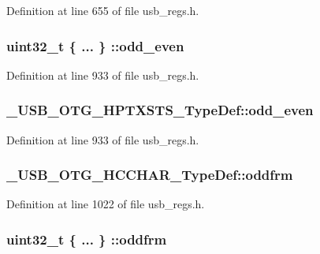 Definition at line 655 of file usb\-\_\-regs.\-h.

\hypertarget{group___u_s_b___o_t_g___d_r_i_v_e_r_gad65d7f25e633ae62cfa42f7c4ef99378}{
\subsubsection[{odd\-\_\-even}]{\setlength{\rightskip}{0pt plus 5cm}uint32\-\_\-t \{ ... \} \-::odd\-\_\-even}}\label{group___u_s_b___o_t_g___d_r_i_v_e_r_gad65d7f25e633ae62cfa42f7c4ef99378}


Definition at line 933 of file usb\-\_\-regs.\-h.

\hypertarget{group___u_s_b___o_t_g___d_r_i_v_e_r_ga668937b5e6c1ce05ba41a2b1a71dcddd}{
\subsubsection[{odd\-\_\-even}]{ \-\_\-\-U\-S\-B\-\_\-\-O\-T\-G\-\_\-\-H\-P\-T\-X\-S\-T\-S\-\_\-\-Type\-Def\-::odd\-\_\-even}}\label{group___u_s_b___o_t_g___d_r_i_v_e_r_ga668937b5e6c1ce05ba41a2b1a71dcddd}


Definition at line 933 of file usb\-\_\-regs.\-h.

\hypertarget{group___u_s_b___o_t_g___d_r_i_v_e_r_gac32b5a32fe881b0a669794c7a78665ed}{
\subsubsection[{oddfrm}]{ \-\_\-\-U\-S\-B\-\_\-\-O\-T\-G\-\_\-\-H\-C\-C\-H\-A\-R\-\_\-\-Type\-Def\-::oddfrm}}\label{group___u_s_b___o_t_g___d_r_i_v_e_r_gac32b5a32fe881b0a669794c7a78665ed}


Definition at line 1022 of file usb\-\_\-regs.\-h.

\hypertarget{group___u_s_b___o_t_g___d_r_i_v_e_r_ga88eac56129b5a11d8c00d94b5c20b108}{
\subsubsection[{oddfrm}]{\setlength{\rightskip}{0pt plus 5cm}uint32\-\_\-t \{ ... \} \-::oddfrm}}\label{group___u_s_b___o_t_g___d_r_i_v_e_r_ga88eac56129b5a11d8c00d94b5c20b108}


